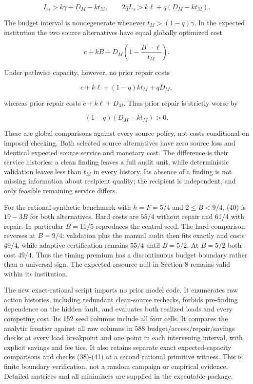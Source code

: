 \documentclass[
  11pt,
  a4paper,
]{article}
\begin{document}
\[L_s>k\gamma+D_M-kt_M,\qquad
2qL_s>k\ell+q(D_M-kt_M). \tag{39}\]

The budget interval is nondegenerate whenever \(t_M>(1-q)\gamma\). In
the expected institution the two source alternatives have equal globally
optimized cost

\[c+kB+D_M\left(1-\frac{B-\ell}{t_M}\right). \tag{40}\]

Under pathwise capacity, however, no prior repair costs

\[c+k\ell+(1-q)kt_M+qD_M,\]

whereas prior repair costs \(c+k\ell+D_M\). Thus prior repair is
strictly worse by

\[(1-q)(D_M-kt_M)>0. \tag{41}\]

These are global comparisons against every source policy, not costs
conditional on imposed checking. Both selected source alternatives have
zero source loss and identical expected source service and monetary
cost. The difference is their service histories: a clean finding leaves
a full audit unit, while deterministic validation leaves less than
\(t_M\) in every history. Its absence of a finding is not missing
information about recipient quality; the recipient is independent, and
only feasible remaining service differs.

For the rational synthetic benchmark with \(h=F=5/4\) and
\(2\leq B<9/4\), (40) is \(19-3B\) for both alternatives. Hard costs are
\(55/4\) without repair and \(61/4\) with repair. In particular
\(B=11/5\) reproduces the central seed. The hard comparison reverses at
\(B=9/4\): validation plus the manual audit then fits exactly and costs
\(49/4\), while adaptive certification remains \(55/4\) until \(B=5/2\).
At \(B=5/2\) both cost \(49/4\). Thus the timing premium has a
discontinuous budget boundary rather than a universal sign. The
expected-resource null in Section 8 remains valid within its
institution.

The new exact-rational script imports no prior model code. It enumerates
raw action histories, including redundant clean-source rechecks, forbids
pre-finding dependence on the hidden fault, and evaluates both realized
loads and every competing cost. Its 152 seed columns include all four
cells. It compares the analytic frontier against all raw columns in 588
budget/access/repair/savings checks at every load breakpoint and one
point in each intervening interval, with explicit savings and fee ties.
It also retains separate exact expected-capacity comparisons and checks
(38)-(41) at a second rational primitive witness. This is finite
boundary verification, not a random campaign or empirical evidence.
Detailed matrices and all minimizers are supplied in the executable
package.
\end{document}
